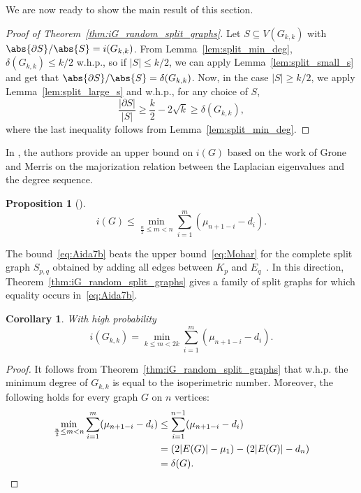 \documentclass[a4paper,11pt]{article}
\newtheorem{corollary}[theorem]{Corollary}
\newtheorem{proposition}[theorem]{Proposition}
\theoremstyle{definition}
\begin{document}
We are now ready to show the main result of this section.

\begin{proof}[Proof of Theorem~\ref{thm:iG_random_split_graphs}]
    Let $S \subseteq V(G_{k, k})$ with $\abs{\partial S}/\abs{S}=i(G_{k, k})$. From Lemma~\ref{lem:split_min_deg}, $\delta(G_{k, k}) \leq k/2$ w.h.p., so if $|S| \leq k/2$, we can apply Lemma~\ref{lem:split_small_s} and get that $\abs{\partial S}/\abs{S} = \delta(G_{k, k})$. Now, in the case $|S| \geq k/2$, we apply Lemma~\ref{lem:split_large_s} and w.h.p., for any choice of $S$,
    \begin{equation*}
        \frac{|\partial S|}{|S|} \geq \frac{k}{2} - 2\sqrt{k} \geq \delta(G_{k, k}), 
    \end{equation*}
    where the last inequality follows from Lemma~\ref{lem:split_min_deg}. 
\end{proof}

In \cite{AFHP2014}, the authors provide an upper bound on $i(G)$ based on the work of Grone and Merris on the majorization relation between the Laplacian eigenvalues and the degree sequence.

\begin{proposition}[{\cite[Proposition 4.6]{AFHP2014}}]
    \label{propo:Aida7b}
    \begin{equation}
    \label{eq:Aida7b}
        i(G)\leq  \min_{\frac{n}{2}\leq m < n} \sum_{i=1}^{m}(\mu_{n+1-i} - d_{i}).
    \end{equation}
\end{proposition}

The bound~\eqref{eq:Aida7b} beats the upper bound~\eqref{eq:Mohar} for the complete split graph $S_{p, q}$ obtained by adding all edges between $K_p$ and $E_q$~\cite[Example 4.7]{AFHP2014}. In this direction, Theorem~\ref{thm:iG_random_split_graphs} gives a family of split graphs for which equality occurs in~\eqref{eq:Aida7b}.

\begin{corollary}
   With high probability
    \begin{equation*}
        i\left(G_{k, k}\right) =  \min_{k\leq m < 2k} \sum_{i=1}^{m}(\mu_{n+1-i} - d_{i}).
    \end{equation*}
\end{corollary}
\begin{proof}
It follows from Theorem~\ref{thm:iG_random_split_graphs} that w.h.p. the minimum degree of $G_{k, k}$ is equal to the isoperimetric number. Moreover, the following holds for every graph $G$ on $n$ vertices:
\begin{align*}
    \min_{\frac{n}{2}\leq m < n} \sum_{i=1}^{m}(\mu_{n+1-i} - d_{i})& \leq \sum_{i=1}^{n-1}(\mu_{n+1-i} - d_{i})\\
    &= (2|E(G)|-\mu_1)-(2|E(G)|-d_n) \\&= \delta(G). \qedhere
\end{align*}
\end{proof}
\end{document}
